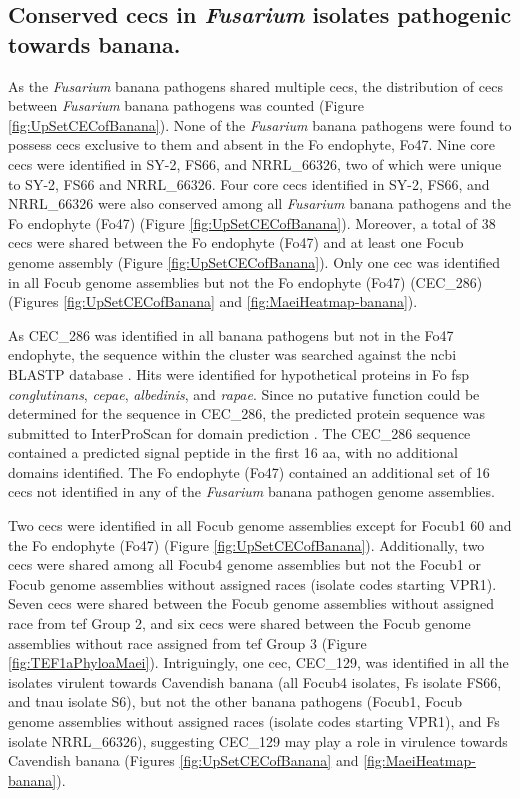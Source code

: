 \subsection{Conserved \aclp{cec} in \textit{Fusarium} isolates pathogenic towards banana.} 

As the \textit{Fusarium} banana pathogens shared multiple \acp{cec}, the distribution of \acp{cec} between \textit{Fusarium} banana pathogens was counted (Figure \ref{fig:UpSetCECofBanana}). None of the \textit{Fusarium} banana pathogens were found to possess \acp{cec} exclusive to them and absent in the \ac{Fo} endophyte, Fo47. Nine core \acp{cec} were identified in SY-2, FS66, and NRRL\_66326, two of which were unique to SY-2,  FS66 and NRRL\_66326. Four core \acp{cec} identified in SY-2, FS66, and NRRL\_66326 were also conserved among all \textit{Fusarium} banana pathogens and the \ac{Fo} endophyte (Fo47) (Figure \ref{fig:UpSetCECofBanana}). Moreover, a total of 38 \acp{cec} were shared between the \ac{Fo} endophyte (Fo47) and at least one \ac{Focub} genome assembly (Figure \ref{fig:UpSetCECofBanana}). Only one \ac{cec} was identified in all \ac{Focub} genome assemblies but not the \ac{Fo} endophyte (Fo47) (CEC\_286) (Figures \ref{fig:UpSetCECofBanana} and \ref{fig:MaeiHeatmap-banana}). 

As CEC\_286 was identified in all banana pathogens but not in the Fo47 endophyte, the sequence within the cluster was searched against the \ac{ncbi} BLASTP database \parencite{Nih2014}. Hits were identified for hypothetical proteins in \ac{Fo} \ac{fsp} \textit{conglutinans}, \textit{cepae}, \textit{albedinis}, and \textit{rapae}. Since no putative function could be determined for the sequence in CEC\_286, the predicted protein sequence was submitted to InterProScan for domain prediction \parencite{jones2014interproscan}. The CEC\_286 sequence contained a predicted signal peptide in the first 16 aa, with no additional domains identified. The \ac{Fo} endophyte (Fo47) contained an additional set of 16 \acp{cec} not identified in any of the \textit{Fusarium} banana pathogen genome assemblies.

Two \acp{cec} were identified in all \ac{Focub} genome assemblies except for  \ac{Focub1} 60 and the \ac{Fo} endophyte (Fo47) (Figure \ref{fig:UpSetCECofBanana}). Additionally, two \acp{cec} were shared among all \ac{Focub4} genome assemblies but not the \ac{Focub1} or \ac{Focub} genome assemblies without assigned races (isolate codes starting VPR1). Seven \acp{cec} were shared between the \ac{Focub} genome assemblies without assigned race from \ac{tef} Group 2, and six \acp{cec} were shared between the \ac{Focub} genome assemblies without race assigned from \ac{tef} Group 3 (Figure \ref{fig:TEF1aPhyloaMaei}). Intriguingly, one \ac{cec}, CEC\_129, was identified in all the isolates virulent towards Cavendish banana (all \ac{Focub4} isolates, \ac{Fs} isolate FS66, and \ac{tnau} isolate S6),  but not the other banana pathogens (\ac{Focub1}, \ac{Focub} genome assemblies without assigned races (isolate codes starting VPR1), and \ac{Fs} isolate NRRL\_66326), suggesting CEC\_129 may play a role in virulence towards Cavendish banana (Figures \ref{fig:UpSetCECofBanana} and \ref{fig:MaeiHeatmap-banana}).

